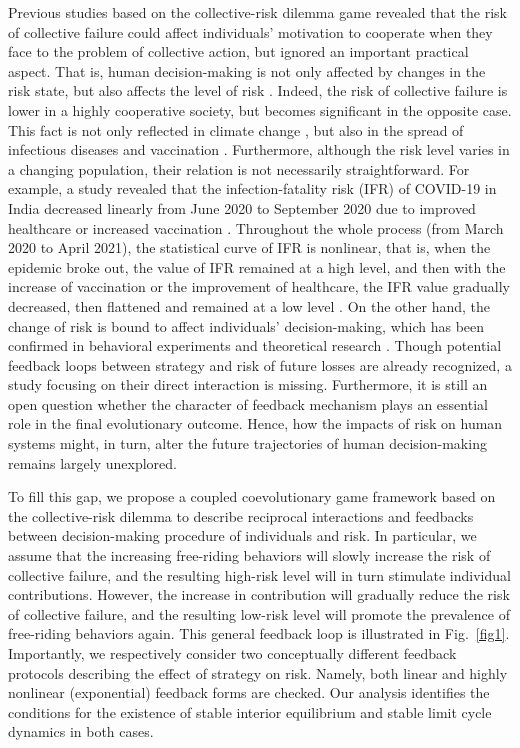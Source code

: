 \documentclass[9pt]{elife}
\begin{document}
Previous studies based on the collective-risk dilemma game revealed that the risk of collective failure could affect individuals' motivation to cooperate when they face to the problem of collective action, but ignored an important practical aspect. That is, human decision-making is not only affected by changes in the risk state, but also affects the level of risk \citep{chen2012risk}. Indeed, the risk of collective failure is lower in a highly cooperative society, but becomes significant in the opposite case. This fact is not only reflected in climate change \citep{moore2022determinants}, but also in the spread of infectious diseases \citep{chen2022highly} and vaccination \citep{nichol1998benefits,chen2019imperfect}. Furthermore, although the risk level varies in a changing population, their relation is not necessarily straightforward. For example, a study revealed that the infection-fatality risk (IFR) of COVID-19 in India decreased linearly from June 2020 to September 2020 due to improved healthcare or increased vaccination \citep{yang2022covid}. Throughout the whole process (from March 2020 to April 2021), the statistical curve of IFR is nonlinear, that is, when the epidemic broke out, the value of IFR remained at a high level, and then with the increase of vaccination or the improvement of healthcare, the IFR value gradually decreased, then flattened and remained at a low level \citep{yang2022covid}. On the other hand, the change of risk is bound to affect individuals' decision-making, which has been confirmed in behavioral experiments and theoretical research \citep{milinski2008collective,pacheco2014climate}. Though potential feedback loops between strategy and risk of future losses are already recognized, a study focusing on their direct interaction is missing. Furthermore, it is still an open question whether the character of feedback mechanism plays an essential role in the final evolutionary outcome. Hence, how the impacts of risk on human systems might, in turn, alter the future trajectories of human decision-making remains largely unexplored.

To fill this gap, we propose a coupled coevolutionary game framework based on the collective-risk dilemma to describe reciprocal interactions and feedbacks between decision-making procedure of individuals and risk. In particular, we assume that the increasing free-riding behaviors will slowly increase the risk of collective failure, and the resulting high-risk level will in turn stimulate individual contributions. However, the increase in contribution will gradually reduce the risk of collective failure, and the resulting low-risk level will promote the prevalence of free-riding behaviors again. This general feedback loop is illustrated in Fig.~\ref{fig1}. Importantly, we respectively consider two conceptually different feedback protocols describing the effect of strategy on risk. Namely, both linear and highly nonlinear (exponential) feedback forms are checked. Our analysis identifies the conditions for the existence of stable interior equilibrium and stable limit cycle dynamics in both cases.
\end{document}
